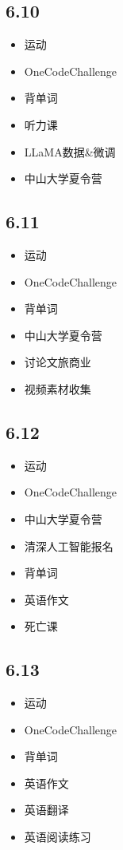 \documentclass[UTF8]{ctexart}
\begin{document}
\subsection*{6.10}
\begin{itemize}
    \item 运动
    \item OneCodeChallenge
    \item 背单词
    \item 听力课
    \item LLaMA数据\&微调
    \item 中山大学夏令营
\end{itemize}

\subsection*{6.11}
\begin{itemize}
    \item 运动
    \item OneCodeChallenge
    \item 背单词
    \item 中山大学夏令营
    \item 讨论文旅商业
    \item 视频素材收集
\end{itemize}

\subsection*{6.12}
\begin{itemize}
    \item 运动
    \item OneCodeChallenge
    \item 中山大学夏令营
    \item 清深人工智能报名
    \item 背单词
    \item 英语作文
    \item 死亡课
\end{itemize}

\subsection*{6.13}
\begin{itemize}
    \item 运动
    \item OneCodeChallenge
    \item 背单词
    \item 英语作文
    \item 英语翻译
    \item 英语阅读练习
\end{itemize}
\end{document}
